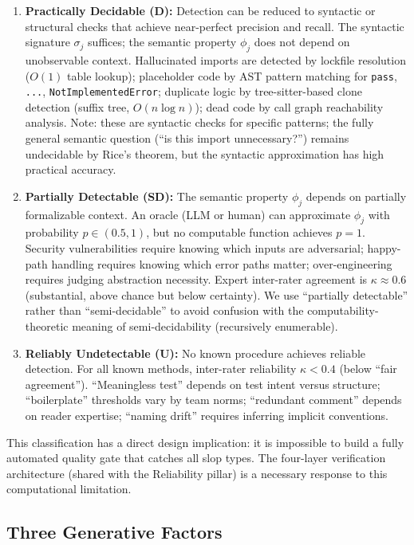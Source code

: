 \documentclass[11pt, a4paper, logo, copyright]{googledeepmind}
\begin{document}
\begin{enumerate}
    \item \textbf{Practically Decidable (D):} Detection can be reduced to syntactic or structural checks that achieve near-perfect precision and recall. The syntactic signature $\sigma_j$ suffices; the semantic property $\phi_j$ does not depend on unobservable context. Hallucinated imports are detected by lockfile resolution ($O(1)$ table lookup); placeholder code by AST pattern matching for \texttt{pass}, \texttt{...}, \texttt{NotImplementedError}; duplicate logic by tree-sitter-based clone detection (suffix tree, $O(n \log n)$); dead code by call graph reachability analysis. Note: these are syntactic checks for specific patterns; the fully general semantic question (``is this import unnecessary?'') remains undecidable by Rice's theorem, but the syntactic approximation has high practical accuracy.

    \item \textbf{Partially Detectable (SD):} The semantic property $\phi_j$ depends on partially formalizable context. An oracle (LLM or human) can approximate $\phi_j$ with probability $p \in (0.5, 1)$, but no computable function achieves $p = 1$. Security vulnerabilities require knowing which inputs are adversarial; happy-path handling requires knowing which error paths matter; over-engineering requires judging abstraction necessity. Expert inter-rater agreement is $\kappa \approx 0.6$ (substantial, above chance but below certainty). We use ``partially detectable'' rather than ``semi-decidable'' to avoid confusion with the computability-theoretic meaning of semi-decidability (recursively enumerable).

    \item \textbf{Reliably Undetectable (U):} No known procedure achieves reliable detection. For all known methods, inter-rater reliability $\kappa < 0.4$ (below ``fair agreement''). ``Meaningless test'' depends on test intent versus structure; ``boilerplate'' thresholds vary by team norms; ``redundant comment'' depends on reader expertise; ``naming drift'' requires inferring implicit conventions.
\end{enumerate}

This classification has a direct design implication: it is impossible to build a fully automated quality gate that catches all slop types. The four-layer verification architecture (shared with the Reliability pillar) is a necessary response to this computational limitation.

\subsection{Three Generative Factors}
\end{document}

